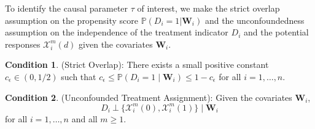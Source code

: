 \documentclass[12pt]{article}
\def\be{\begin{equation}}
\def\ee{\end{equation}}
\theoremstyle{definition}
\newtheorem{as}{Condition}
\newcommand{\bW}{{\mathbf W}}
\newcommand{\bX}{{\mathbf X}}
\begin{document}
To identify the causal parameter $\tau$ of interest, we make the strict overlap assumption on the
propensity score $\mathbb{P}(D_{i} = 1 | \bW_{i})$ and the unconfoundedness assumption \citep{rosenbaum1983, hirano2003} on the independence of the treatment indicator $D_{i}$ and the potential responses $\mathcal{X}_i^m(d)$ given the covariates $\bW_{i}$.

\begin{as}
(Strict Overlap): There exists a small positive constant $c_{\epsilon} \in (0, 1/2)$ such that $c_{\epsilon} \leq \mathbb{P}(D_{i} = 1 \mid \bW_{i}) \leq 1 - c_{\epsilon}$
for all $i = 1, \ldots, n$. 
\label{as:overlap}\end{as}

\begin{as}
(Unconfounded Treatment Assignment): Given the covariates $\bW_{i}$,
\be
D_{i} ~ \bot ~ \{\mathcal{X}_i^m(0), \mathcal{X}_i^m(1)\} \mid \bW_{i}
\label{eq:UCF}\ee
for all $i = 1, \ldots, n$ and all $m \geq 1$. 
\label{as:UCF}\end{as}
\end{document}

